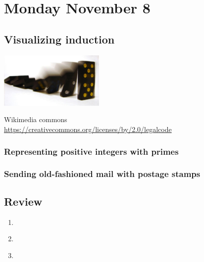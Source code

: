 

\section*{Monday November 8}
\subsection*{Visualizing induction}


\begin{center}
    \includegraphics[width=2in]{../../resources/images/Domino_Cascade.jpeg}

    {\tiny Wikimedia commons\\ \href{https://creativecommons.org/licenses/by/2.0/legalcode}{https://creativecommons.org/licenses/by/2.0/legalcode} }
\end{center}


\newpage


\subsubsection*{Representing positive integers with primes}

\subsubsection*{Sending old-fashioned mail with postage stamps}

\newpage
\subsection*{Review}
\begin{enumerate}
    \item \hspace{1in} \\ 
    \item \hspace{1in}\\ 
    \newpage
    \item 
\end{enumerate}

